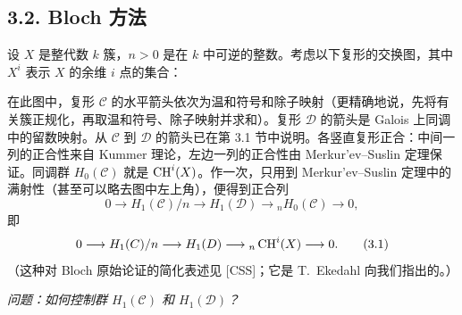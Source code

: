 \subsection*{3.2. Bloch 方法}
设 $X$ 是整代数 $k$ 簇，$n>0$ 是在 $k$ 中可逆的整数。考虑以下复形的交换图，其中 $X^i$ 表示 $X$ 的余维 $i$ 点的集合：
\begin{center}
\end{center}
在此图中，复形 $\mathcal C$ 的水平箭头依次为温和符号和除子映射（更精确地说，先将有关簇正规化，再取温和符号、除子映射并求和）。复形 $\mathcal D$ 的箭头是 Galois 上同调中的留数映射。从 $\mathcal C$ 到 $\mathcal D$ 的箭头已在第 3.1 节中说明。各竖直复形正合：中间一列的正合性来自 Kummer 理论，左边一列的正合性由 Merkur'ev--Suslin 定理保证。同调群 $H_0(\mathcal C)$ 就是 $\operatorname{CH}^i(X)$。作一次，只用到 Merkur'ev--Suslin 定理中的满射性（甚至可以略去图中左上角），便得到正合列
\[
0\longrightarrow H_1(\mathcal C)/n\longrightarrow H_1(\mathcal D)\longrightarrow{}_nH_0(\mathcal C)\longrightarrow0,
\]
即
\begin{equation*}
0\longrightarrow H_1(C)/n\longrightarrow H_1(D)\longrightarrow{}_n\operatorname{CH}^i(X)\longrightarrow0.\tag{3.1}
\end{equation*}
（这种对 Bloch 原始论证的简化表述见 [CSS]；它是 T.~Ekedahl 向我们指出的。）

\textit{问题：如何控制群 $H_1(\mathcal C)$ 和 $H_1(\mathcal D)$？}

